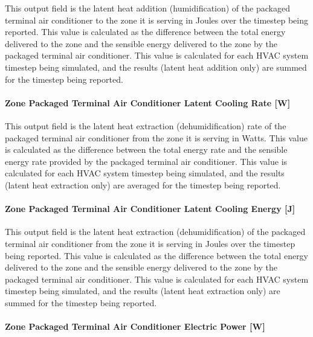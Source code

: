 This output field is the latent heat addition (humidification) of the packaged terminal air conditioner to the zone it is serving in Joules over the timestep being reported. This value is calculated as the difference between the total energy delivered to the zone and the sensible energy delivered to the zone by the packaged terminal air conditioner. This value is calculated for each HVAC system timestep being simulated, and the results (latent heat addition only) are summed for the timestep being reported.

\paragraph{Zone Packaged Terminal Air Conditioner Latent Cooling Rate {[}W{]}}\label{zone-packaged-terminal-air-conditioner-latent-cooling-rate-w}

This output field is the latent heat extraction (dehumidification) rate of the packaged terminal air conditioner from the zone it is serving in Watts. This value is calculated as the difference between the total energy rate and the sensible energy rate provided by the packaged terminal air conditioner. This value is calculated for each HVAC system timestep being simulated, and the results (latent heat extraction only) are averaged for the timestep being reported.

\paragraph{Zone Packaged Terminal Air Conditioner Latent Cooling Energy {[}J{]}}\label{zone-packaged-terminal-air-conditioner-latent-cooling-energy-j}

This output field is the latent heat extraction (dehumidification) of the packaged terminal air conditioner from the zone it is serving in Joules over the timestep being reported. This value is calculated as the difference between the total energy delivered to the zone and the sensible energy delivered to the zone by the packaged terminal air conditioner. This value is calculated for each HVAC system timestep being simulated, and the results (latent heat extraction only) are summed for the timestep being reported.

\paragraph{Zone Packaged Terminal Air Conditioner Electric Power {[}W{]}}\label{zone-packaged-terminal-air-conditioner-electric-power-w}

